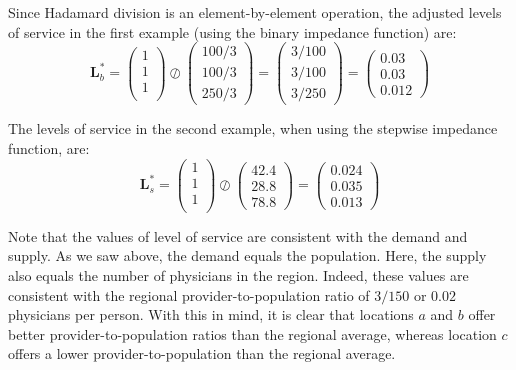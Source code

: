 \documentclass[10pt,letterpaper]{article}
\begin{document}
Since Hadamard division is an element-by-element operation, the adjusted
levels of service in the first example (using the binary impedance
function) are: \[
\mathbf{L}^*_b = \left( \begin{array}{c}
1 \\
1 \\
1 \\
\end{array}\right)\oslash
\left( \begin{array}{c}
100/3\\
100/3\\
250/3
\end{array} \right)=
\left( \begin{array}{c}
3/100\\
3/100\\
3/250
\end{array} \right)=
\left( \begin{array}{c}
0.03\\
0.03\\
0.012
\end{array} \right)
\]

The levels of service in the second example, when using the stepwise
impedance function, are: \[
\mathbf{L}^*_s = \left( \begin{array}{c}
1 \\
1 \\
1 \\
\end{array}\right)\oslash
\left( \begin{array}{c}
42.4\\
28.8\\
78.8
\end{array} \right)=
\left( \begin{array}{c}
0.024\\
0.035\\
0.013
\end{array} \right)
\]

Note that the values of level of service are consistent with the demand
and supply. As we saw above, the demand equals the population. Here, the
supply also equals the number of physicians in the region. Indeed, these
values are consistent with the regional provider-to-population ratio of
\(3/150\) or \(0.02\) physicians per person. With this in mind, it is
clear that locations \(a\) and \(b\) offer better provider-to-population
ratios than the regional average, whereas location \(c\) offers a lower
provider-to-population than the regional average.
\end{document}
